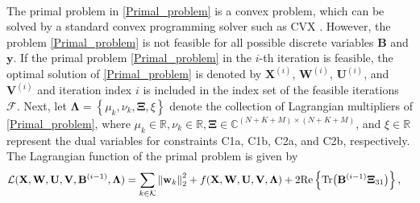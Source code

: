 \documentclass[12pt, draftclsnofoot, onecolumn]{IEEEtran}
\begin{document}
\begin{eqnarray}
\end{eqnarray}
The primal problem in \eqref{Primal_problem} is a convex problem, which can be solved by a standard convex programming solver such as CVX \cite{grant2008cvx}. However, the problem \eqref{Primal_problem} is not feasible for all possible discrete variables $\mathbf{B}$ and $\mathbf{y}$. If the primal problem \eqref{Primal_problem} in the $i$-th iteration is feasible, the optimal solution of \eqref{Primal_problem} is denoted by $\mathbf{X}^{(i)}$, $\mathbf{W}^{(i)}$, $\mathbf{U}^{(i)}$, and $\mathbf{V}^{(i)}$ and iteration index $i$ is included in the index set of the feasible iterations $\mathcal{F}$. Next, let $\bm{\Lambda}=\left\{\mu_k,\nu_k,\bm{\Xi},{\xi}\right\}$ denote the collection of Lagrangian multipliers of \eqref{Primal_problem}, where $\mu_k\in\mathbb{R},\nu_k\in\mathbb{R},\bm{\Xi}\in\mathbb{C}^{(N+K+M)\times (N+K+M)}$, and ${\xi}\in\mathbb{R}$ represent the dual variables for constraints C1a, C1b, C2a, and C2b, respectively. The Lagrangian function of the primal problem is given by 
\begin{equation}\label{Largrangian_conf}
    \begin{aligned}
            \mathcal{L}(\mathbf{X},\mathbf{W},\mathbf{U},\mathbf{V},\mathbf{B}^{(i-1)},\bm{\Lambda})&=\sum_{k\in\mathcal{K}}\left\|\mathbf{w}_k\right\|_2^2+f(\mathbf{X},\mathbf{W},\mathbf{U},\mathbf{V},\bm{\Lambda})+2\mathrm{Re}\left\{\mathrm{Tr}\big(\mathbf{B}^{(i-1)}\bm{\Xi}_{31}\big)\right\},
    \end{aligned}\vspace*{-2mm}
\end{equation}
\end{document}

